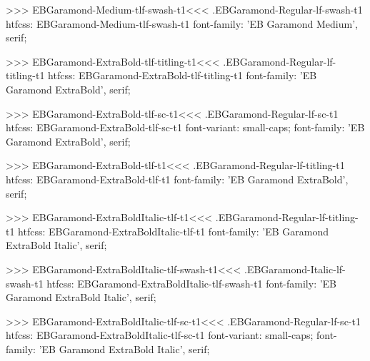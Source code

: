 {{{{{{{>>>
\<EBGaramond-Medium-tlf-swash-t1\><<<
.EBGaramond-Regular-lf-swash-t1
htfcss:  EBGaramond-Medium-tlf-swash-t1  font-family: 'EB Garamond Medium', serif;

>>>
\<EBGaramond-ExtraBold-tlf-titling-t1\><<<
.EBGaramond-Regular-lf-titling-t1
htfcss:  EBGaramond-ExtraBold-tlf-titling-t1  font-family: 'EB Garamond ExtraBold', serif;

>>>
\<EBGaramond-ExtraBold-tlf-sc-t1\><<<
.EBGaramond-Regular-lf-sc-t1
htfcss:  EBGaramond-ExtraBold-tlf-sc-t1  font-variant: small-caps; font-family: 'EB Garamond ExtraBold', serif;

>>>
\<EBGaramond-ExtraBold-tlf-t1\><<<
.EBGaramond-Regular-lf-titling-t1
htfcss:  EBGaramond-ExtraBold-tlf-t1  font-family: 'EB Garamond ExtraBold', serif;

>>>
\<EBGaramond-ExtraBoldItalic-tlf-t1\><<<
.EBGaramond-Regular-lf-titling-t1
htfcss:  EBGaramond-ExtraBoldItalic-tlf-t1  font-family: 'EB Garamond ExtraBold Italic', serif;

>>>
\<EBGaramond-ExtraBoldItalic-tlf-swash-t1\><<<
.EBGaramond-Italic-lf-swash-t1
htfcss:  EBGaramond-ExtraBoldItalic-tlf-swash-t1  font-family: 'EB Garamond ExtraBold Italic', serif;

>>>
\<EBGaramond-ExtraBoldItalic-tlf-sc-t1\><<<
.EBGaramond-Regular-lf-sc-t1
htfcss:  EBGaramond-ExtraBoldItalic-tlf-sc-t1  font-variant: small-caps; font-family: 'EB Garamond ExtraBold Italic', serif;

}}}}}}}
